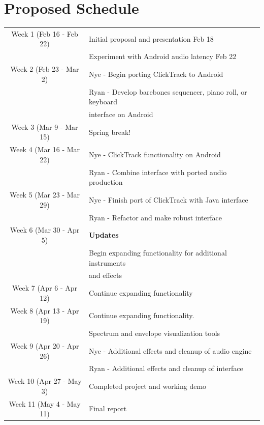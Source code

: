 \documentclass[letterpaper,12pt]{article}
\begin{document}
\section*{Proposed Schedule}

\begin{tabular}{| c || l |}
  \hline 
  Week 1 (Feb 16 - Feb 22) & Initial proposal and presentation Feb 18 \\ 
                           & Experiment with Android audio latency Feb 22 \\ \hline
  Week 2 (Feb 23 - Mar 2)  & Nye - Begin porting ClickTrack to Android \\
                           & Ryan -  Develop barebones sequencer, piano roll, or keyboard \\ &interface on Android \\ \hline
  Week 3 (Mar 9 - Mar 15)  & Spring break!  \\ \hline
  Week 4 (Mar 16 - Mar 22) & Nye - ClickTrack functionality on Android \\ 
                           & Ryan - Combine interface with ported audio production \\ \hline
  Week 5 (Mar 23 - Mar 29) & Nye - Finish port of ClickTrack with Java interface \\
                           & Ryan - Refactor and make robust interface \\ \hline
  Week 6 (Mar 30 - Apr 5)  & \textbf{Updates} \\
                           & Begin expanding functionality for additional instruments \\ & and effects\\ \hline
  Week 7 (Apr 6 - Apr 12)  &  Continue expanding functionality \\ \hline
  Week 8 (Apr 13 - Apr 19) & Continue expanding functionality. \\
                           & Spectrum and envelope visualization tools \\ \hline
  Week 9 (Apr 20 - Apr 26) & Nye - Additional effects and cleanup of audio engine \\
                           & Ryan - Additional effects and cleanup of interface \\ \hline
  Week 10 (Apr 27 - May 3) & Completed project and working demo  \\ \hline
  Week 11 (May 4 - May 11) & Final report  \\ \hline
\end{tabular}
\end{document}

